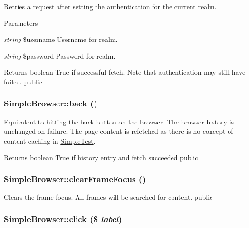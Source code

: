 \label{class_simple_browser_ae0f4f39b95050c895049df6d5e48b731}
Retries a request after setting the authentication for the current realm. 
\begin{DoxyParams}{Parameters}
\item[{\em string}]\$username Username for realm. \item[{\em string}]\$password Password for realm. \end{DoxyParams}
\begin{DoxyReturn}{Returns}
boolean True if successful fetch. Note that authentication may still have failed.  public 
\end{DoxyReturn}
\hypertarget{class_simple_browser_a2fda047202943fe6bfd3708cd557c3d0}{
\subsubsection[{back}]{\setlength{\rightskip}{0pt plus 5cm}SimpleBrowser::back ()}}
\label{class_simple_browser_a2fda047202943fe6bfd3708cd557c3d0}
Equivalent to hitting the back button on the browser. The browser history is unchanged on failure. The page content is refetched as there is no concept of content caching in \hyperlink{class_simple_test}{SimpleTest}. \begin{DoxyReturn}{Returns}
boolean True if history entry and fetch succeeded  public 
\end{DoxyReturn}
\hypertarget{class_simple_browser_afe31f064242f5fcc4d00f73088ea6a91}{
\subsubsection[{clearFrameFocus}]{\setlength{\rightskip}{0pt plus 5cm}SimpleBrowser::clearFrameFocus ()}}
\label{class_simple_browser_afe31f064242f5fcc4d00f73088ea6a91}
Clears the frame focus. All frames will be searched for content.  public \hypertarget{class_simple_browser_a8d4514b3ad63fb04756ba0dccf3cbd78}{
\subsubsection[{click}]{\setlength{\rightskip}{0pt plus 5cm}SimpleBrowser::click (\$ {\em label})}}
\label{class_simple_browser_a8d4514b3ad63fb04756ba0dccf3cbd78}
